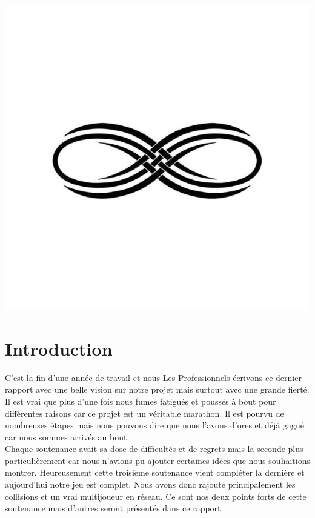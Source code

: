 \documentclass[12pt]{article}
\begin{document}
\begin{center}
\includegraphics[scale=00.20]{infini}
\end{center}


\setlength{\headheight}{13pt} %
\setlength{\headsep}{2.5cm} %
\setlength{\footskip}{2.5cm}

\newpage
\thispagestyle{empty}
\pagestyle{fancyplain} \chead{} 
\tableofcontents

\newpage
\setcounter{page}{1} 
\section{Introduction}

C’est la fin d’une année de travail et nous Les Professionnels écrivons ce dernier rapport avec une belle vision sur notre projet mais surtout avec une grande fierté. Il est vrai que plus d’une fois nous fumes fatigués et poussés à bout pour différentes raisons car ce projet est un véritable marathon. Il est pourvu de nombreuses étapes mais nous pouvons dire que nous l’avons d’ores et déjà gagné car nous sommes arrivés au bout.\\

Chaque soutenance avait sa dose de difficultés et de regrets mais la seconde plus particulièrement car nous n’avions pu ajouter certaines idées que nous souhaitions montrer. Heureusement cette troisième soutenance vient compléter la dernière et aujourd’hui notre jeu est complet. Nous avons donc rajouté principalement les collisions et un vrai multijoueur en réseau. Ce sont nos deux points forts de cette soutenance mais d’autres seront présentés dans ce rapport.\\
\end{document}
